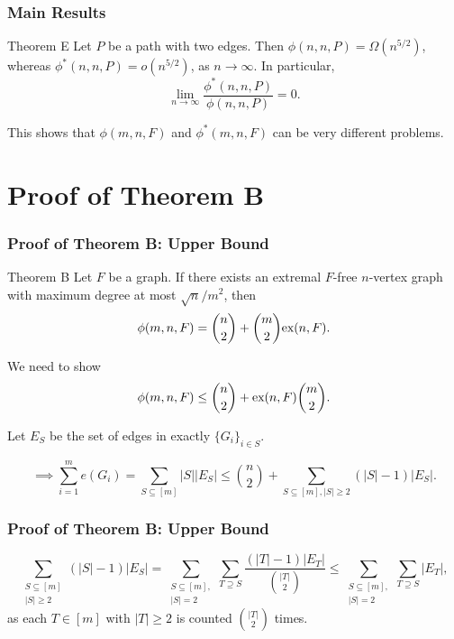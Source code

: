 \documentclass{beamer}
\newcommand*{\ex}{\textnormal{ex}}
\begin{document}
\begin{frame}
  \frametitle{Main Results}

  \begin{block}{Theorem E}
    Let $P$ be a path with two edges. Then $\phi(n, n, P) = \Omega(n^{5/2})$, whereas $\phi^*(n, n, P) = o(n^{5/2})$, as $n \rightarrow \infty$. In particular, 
    \[ 
      \lim_{n \rightarrow \infty} \frac{\phi^*(n, n, P)}{\phi(n, n, P)} = 0.
    \]
  \end{block}

  \pause

  \vspace{0.3cm}

  This shows that $\phi(m, n, F)$ and $\phi^*(m, n, F)$ can be very different problems.
\end{frame}

\section{Proof of Theorem B}

\begin{frame}
  \frametitle{Proof of Theorem B: Upper Bound}

  \begin{block}{Theorem B}
    Let $F$ be a graph. If there exists an extremal $F$-free $n$-vertex graph with maximum degree at most $\sqrt{n}/m^2$, then 
    \[ 
      \phi(m, n, F) = \binom{n}{2} + \binom{m}{2}\ex(n,F).
    \]
  \end{block}

  \pause

  We need to show
  \[  
    \phi(m, n ,F) \leq \binom{n}{2} + \ex(n, F)\binom{m}{2}.  
  \]

  \pause
  
  Let $E_S$ be the set of edges in exactly $\{G_i\}_{i \in S}$.

  \pause

  \[
    \implies \sum_{i = 1}^m e(G_i) = \sum_{S \subseteq [m]} |S||E_S| \leq \binom{n}{2} + \sum_{S \subseteq [m], |S| \geq 2} (|S| - 1)|E_S|.
  \]
\end{frame}

\begin{frame}

  \frametitle{Proof of Theorem B: Upper Bound}

  \[
    \sum_{\substack{S \subseteq [m] \\ |S| \geq 2}} (|S| - 1)|E_S| = \sum_{\substack{S \subseteq [m], \\ |S| = 2}} \sum_{T \supseteq S} \frac{(|T| - 1)|E_T|}{\binom{|T|}{2}} \leq \sum_{\substack{S \subseteq [m], \\ |S| = 2}} \sum_{T \supseteq S} |E_T|,
  \]
  as each $T \in [m]$ with $|T| \geq 2$ is counted $\binom{|T|}{2}$ times.
\end{frame}
\end{document}
